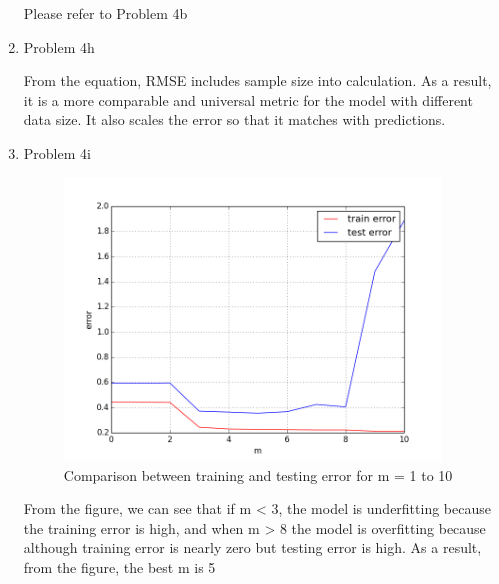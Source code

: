 \documentclass[11pt]{article}
\newcommand{\solution}[1]{{{\color{black}{\bf Solution:} {#1}}}}
\begin{document}
\begin{enumerate}
	\solution{
	Please refer to Problem 4b
	}
	
	\item Problem 4h
	
	\solution{
	From the equation, RMSE includes sample size into calculation. As a result, it is a more comparable and universal metric for the model with different data size. It also scales the error so that it matches with predictions.
	}
	
	
	\vspace{2cm}
	
	\item Problem 4i
	
	\solution{
	
	\begin{figure}[h!]
	\centering
	\includegraphics[width = 10cm]{4i}
	\caption{Comparison between training and testing error for m = 1 to 10}
	\end{figure}
	
	From the figure, we can see that if m < 3, the model is underfitting because the training error is high, and when m > 8 the model is overfitting because although training error is nearly zero but testing error is high. As a result, from the figure, the best m is 5
	
	}
	
	
	
	
	
	
	
	
	

\end{enumerate}
\end{document}
